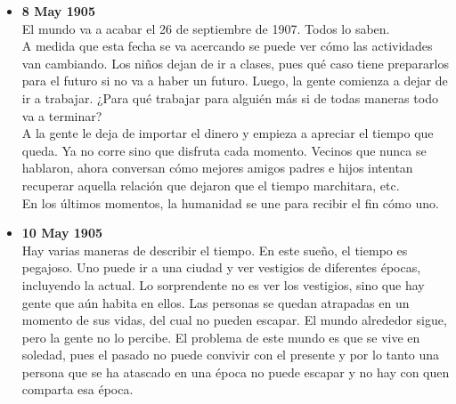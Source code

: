 \documentclass[12pt,a4paper]{report}
\begin{document}
\begin{itemize}
{\begin{itemize}[label=$\bullet$]
{            En este mundo el tiempo transcurre pero no sucede mucho. Esto sucede
            para cualquier métrica: de una hora a otra transcurre tan poco cómo
            de un día a otro, de un més a otro e incluso de un año a otro. El
            tiempo pasa pero no hay un cambio sustancial. Un niño de un año a
            otro solamente tiene un año más. Esta es la forma en la que se mueve
            el tiempo en este mundo.
        }
        \item{\textbf{8 May 1905}\\
            El mundo va a acabar el 26 de septiembre de 1907. Todos lo saben.\\
            A medida que esta fecha se va acercando se puede ver cómo las
            actividades van cambiando. Los niños dejan de ir a clases, pues qué
            caso tiene prepararlos para el futuro si no va a haber un futuro.
            Luego, la gente comienza a dejar de ir a trabajar. ¿Para qué
            trabajar para alguién más si de todas maneras todo va a terminar?\\
            A la gente le deja de importar el dinero y empieza a apreciar el
            tiempo que queda. Ya no corre sino que disfruta cada momento.
            Vecinos que nunca se hablaron, ahora conversan cómo mejores amigos
            padres e hijos intentan recuperar aquella relación que dejaron que
            el tiempo marchitara, etc.\\
            En los últimos momentos, la humanidad se une para recibir el fin
            cómo uno.
        }
        \item{\textbf{10 May 1905}\\
            Hay varias maneras de describir el tiempo. En este sueño, el tiempo
            es pegajoso. Uno puede ir a una ciudad y ver vestigios de diferentes
            épocas, incluyendo la actual. Lo sorprendente no es ver los
            vestigios, sino que hay gente que aún habita en ellos. Las personas
            se quedan atrapadas en un momento de sus vidas, del cual no pueden
            escapar. El mundo alrededor sigue, pero la gente no lo percibe. El
            problema de este mundo es que se vive en soledad, pues el pasado no
            puede convivir con el presente y por lo tanto una persona que se ha
            atascado en una época no puede escapar y no hay con quen comparta
            esa época.
        }
    \end{itemize}
}
\end{itemize}
\end{document}
